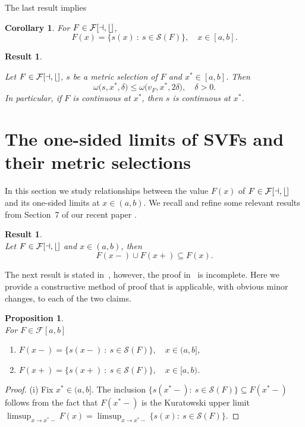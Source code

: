 \documentclass[final,3p,mathptmx]{article}%
\newcommand{\calF}{\cal{F}[a,b]}
\newcommand{\LocalModulCont}[3]{\omega\big( {#1},{#2},{#3} \big)}
\newcommand{\setMS}{\mathcal{S}(F)}
\newtheorem{propos}[remark]{Proposition}
\newtheorem{corol}[remark]{Corollary}
\newtheorem{result}[remark]{Result}
\begin{document}
{{{{The last result implies
\begin{corol}\label{Corol_Repres_F}
For $F \in \calF$,
$$
F(x) = \{ s(x) \ :\ s \in  \setMS \}, \quad x\in [a,b].
$$
\end{corol}

\begin{result}\label{Result_LocModuli_s<=LocModuli_v_F}\cite[Theorem~4.9]{BDFM:2021}
	
	Let $F \in \calF$, $s$ be a metric selection of $F$  and $x^*\in[a,b]$. Then
	$$
	\LocalModulCont{s}{x^*}{\delta} \le \LocalModulCont{v_F}{x^*}{ 2\delta}, \quad \delta >0.
	$$
	In particular, if $F$ is continuous at $x^*$, then $s$ is continuous at $x^*$.
\end{result}


\section{The one-sided limits of SVFs and their  metric selections}\label{Sect_Erratum}

In this section we study relationships between the value $F(x)$ of $F \in \calF$ and its one-sided limits at $x \in (a,b)$. We recall and refine some relevant results from Section~7 of our recent paper \cite{BDFM:2021}.

\begin{result}\label{Result_Right-Left_Limits_in_F} \cite[Proposition~7.1]{BDFM:2021}\\
		Let $F\in \calF$ and $x \in (a,b)$, then 
		$$F(x-) \cup F(x+) \subseteq F(x).$$
\end{result}
	
The next result is stated in~\cite{BDFM:2021}, however, the proof in~\cite{BDFM:2021} is incomplete. Here we provide a constructive method of proof that is applicable, with obvious minor changes, to each of the two claims.
	
	\begin{propos}\label{Propos_RightContSelections} \cite[Proposition~7.2]{BDFM:2021}\; \\
		For $F \in \mathcal{F}[a,b]$ 
		\begin{enumerate}\label{Claim_1-}
			\item[(i)]\quad  $F(x-) = \{ s(x-) \ : \ s \in \mathcal{S}(F) \}, \quad x \in (a,b] $,  
			\item[(ii)]\quad  $F(x+) = \{ s(x+) \ : \ s \in \mathcal{S}(F) \}, \quad x \in [a,b)$.
		\end{enumerate}	
	\end{propos}
	\begin{proof}
		(i) Fix $x^*\in(a,b]$. The inclusion ${\{ s(x^*-): \ s\in \mathcal{S}(F)\} \subseteq F(x^*-)}$ follows from the fact that $F(x^*-)$ is the Kuratowski upper limit 
		$\displaystyle \limsup_{x \to x^*-}{F(x)} =\limsup_{x \to x^*-}{\{ s(x): \ s\in \mathcal{S}(F)\}}$. 
		

\end{proof}}}}}
\end{document}
